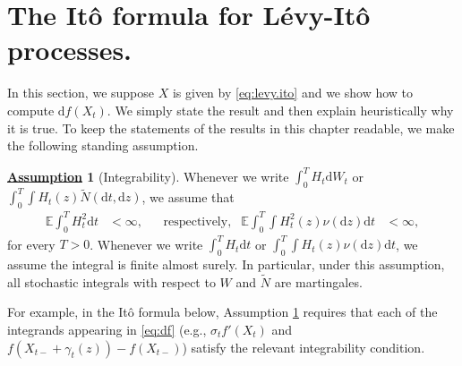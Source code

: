 \documentclass[12pt]{book}
\numberwithin{equation}{chapter}
\theoremstyle{plain}
\numberwithin{theorem}{section}
\theoremstyle{definition}
\newtheorem{assumption}[theorem]{\underline{Assumption}}
\numberwithin{exercise}{chapter}
\newcommand{\<}{\langle}
\renewcommand{\>}{\rangle}
\renewcommand{\(}{\left(}
\renewcommand{\)}{\right)}
\renewcommand{\[}{\left[}
\renewcommand{\]}{\right]}
\newcommand\Eb{\mathds{E}}
\newcommand\sig{\sigma}
\newcommand\gam{\gamma}
\newcommand\Nt{\widetilde{N}}
\newcommand\dd{\mathrm{d}}
\begin{document}

\section{The It\^o formula for L\'evy-It\^o processes.}
In this section, we suppose $X$ is given by \eqref{eq:levy.ito} and we show how to compute $\dd f(X_t)$.  We simply state the result and then explain heuristically why it is true.
To keep the statements of the results in this chapter readable, we make the following standing assumption.

\begin{assumption}[Integrability]
\label{ass:integrability}
Whenever we write $\int_0^T H_t \dd W_t$ or $\int_0^T \int H_t(z) \Nt(\dd t,\dd z)$, we assume that
\begin{align}
\Eb \int_0^T H_t^2 \dd t
	&<	\infty , &
	&\text{respectively}, &
\Eb \int_0^T \int H_t^2(z) \nu(\dd z) \dd t
	&<	\infty ,
\end{align}
for every $T > 0$.  Whenever we write $\int_0^T H_t \dd t$ or $\int_0^T \int H_t(z) \nu(\dd z) \dd t$, we assume the integral is finite almost surely.  In particular, under this assumption, all stochastic integrals with respect to $W$ and $\Nt$ are martingales.
\end{assumption}

\noindent
For example, in the It\^o formula below, Assumption \ref{ass:integrability} requires that each of the integrands appearing in \eqref{eq:df} (e.g., $\sig_t f'(X_t)$ and $f(X_{t-} + \gam_t(z)) - f(X_{t-})$) satisfy the relevant integrability condition.
\end{document}
